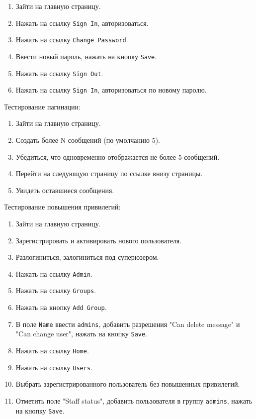 \documentclass[oneside, final, 14pt]{extarticle}
\begin{document}
\begin{enumerate}
\item{Зайти на главную страницу.}
\item{Нажать на ссылку \texttt{Sign In}, авторизоваться.}
\item{Нажать на ссылку \texttt{Change Password}.}
\item{Ввести новый пароль, нажать на кнопку \texttt{Save}.}
\item{Нажать на ссылку \texttt{Sign Out}.}
\item{Нажать на ссылку \texttt{Sign In}, авторизоваться по новому паролю.}
\end{enumerate}

\vspace{0.5cm}

Тестирование пагинации:

\begin{enumerate}
\item{Зайти на главную страницу.}
\item{Создать более N сообщений (по умолчанию 5).}
\item{Убедиться, что одновременно отображается не более 5 сообщений.}
\item{Перейти на следующую страницу по ссылке внизу страницы.}
\item{Увидеть оставшиеся сообщения.}
\end{enumerate}

\vspace{0.5cm}

Тестирование повышения привилегий:

\begin{enumerate}
\item{Зайти на главную страницу.}
\item{Зарегистрировать и активировать нового пользователя.}
\item{Разлогиниться, залогиниться под суперюзером.}
\item{Нажать на ссылку \texttt{Admin}.}
\item{Нажать на ссылку \texttt{Groups}.}
\item{Нажать на кнопку \texttt{Add Group}.}
\item{В поле \texttt{Name} ввести \texttt{admins}, добавить разрешения "Can delete message" и "Can change user", нажать на кнопку \texttt{Save}.}
\item{Нажать на ссылку \texttt{Home}.}
\item{Нажать на ссылку \texttt{Users}.}
\item{Выбрать зарегистрированного пользователь без повышенных привилегий.}
\item{Отметить поле "Staff status", добавить пользователя в группу \texttt{admins}, нажать на кнопку \texttt{Save}.}
\end{enumerate}
\end{document}
